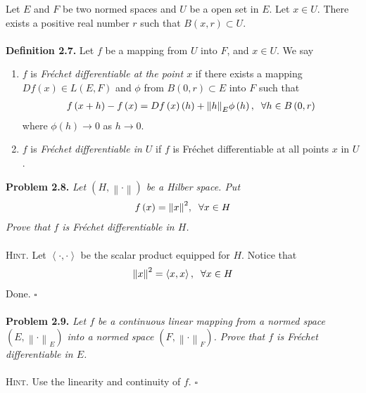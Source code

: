 \documentclass[a4paper]{article}
\numberwithin{equation}{section}
\begin{document}
Let $E$ and $F$ be two normed spaces and $U$ be a open set in $E$. Let $x\in U$. There exists a positive real number $r$ such that $B\left(x,r\right) \subset U$.\\
\\
\textbf{Definition 2.7.} Let $f$ be a mapping from $U$ into $F$, and $x\in U$. We say
\begin{enumerate}
\item $f$ is \textit{Fr\'{e}chet differentiable at the point $x$} if there exists a mapping $Df\left(x\right) \in L\left(E,F\right)$ and $\phi$ from $B\left(0,r\right) \subset E$ into $F$ such that 
\begin{align}
f\left( {x + h} \right) - f\left( x \right) = Df\left( x \right)\left( h \right) + {\left\| h \right\|_E}\phi \left( h \right),\hspace{0.2cm}\forall h \in B\left( {0,r} \right)
\end{align}
where $\phi \left( h \right) \to 0$ as $h \to 0$.
\item $f$ is \textit{Fr\'{e}chet differentiable in $U$} if $f$ is Fr\'{e}chet differentiable at all points $x$ in $U$.
\end{enumerate}
\textbf{Problem 2.8.} \textit{Let $\left( {H,\left\|  \cdot  \right\|} \right)$ be a Hilber space. Put}
\begin{align}
f\left( x \right) = {\left\| x \right\|^2},\hspace{0.2cm}\forall x \in H
\end{align}
\textit{Prove that $f$ is Fr\'{e}chet differentiable in $H$.}\\
\\
\textsc{Hint.} Let $\left\langle { \cdot , \cdot } \right\rangle $ be the scalar product equipped for $H$. Notice that 
\begin{align}
{\left\| x \right\|^2} = \left\langle {x,x} \right\rangle ,\hspace{0.2cm}\forall x \in H
\end{align}
Done. \hfill $\square$\\
\\
\textbf{Problem 2.9.} \textit{Let $f$ be a continuous linear mapping from a normed space $\left( {E,{{\left\|  \cdot  \right\|}_E}} \right)$ into a normed space $\left( {F,{{\left\|  \cdot  \right\|}_F}} \right)$. Prove that $f$ is Fr\'{e}chet differentiable in $E$.}\\
\\
\textsc{Hint.} Use the linearity and continuity of $f$. \hfill $\square$\\
\end{document}

